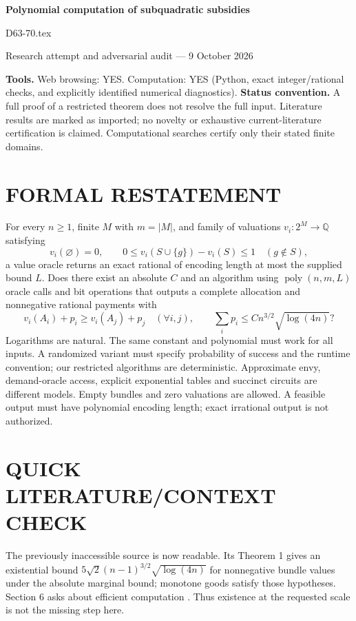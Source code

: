 \documentclass[11pt,a4paper]{article}
\theoremstyle{remark}\newtheorem{remark}[theorem]{Remark}
\begin{document}
\begin{center}
{\LARGE\bfseries Polynomial computation of subquadratic subsidies}\par\medskip
{\large D63-70.tex}\par
Research attempt and adversarial audit --- 9 October 2026
\end{center}
\label{problem:OP-0593}
\label{audited:ECON-006}
\label{audited:conventions}
\textbf{Tools.} Web browsing: YES. Computation: YES (Python, exact integer/rational checks, and explicitly identified numerical diagnostics).
\textbf{Status convention.} A full proof of a restricted theorem does not resolve the full input. Literature results are marked as imported; no novelty or exhaustive current-literature certification is claimed. Computational searches certify only their stated finite domains.

\section{FORMAL RESTATEMENT}
For every $n\ge1$, finite $M$ with $m=|M|$, and family of valuations $v_i:2^M\to\mathbb Q$ satisfying
\[
v_i(\varnothing)=0,\qquad 0\le v_i(S\cup\{g\})-v_i(S)\le1\quad(g\notin S),
\]
a value oracle returns an exact rational of encoding length at most the supplied bound $L$. Does there exist an absolute $C$ and an algorithm using $\operatorname{poly}(n,m,L)$ oracle calls and bit operations that outputs a complete allocation and nonnegative rational payments with
\[
v_i(A_i)+p_i\ge v_i(A_j)+p_j\quad(\forall i,j),\qquad
\sum_i p_i\le C n^{3/2}\sqrt{\log(4n)}?
\]
Logarithms are natural. The same constant and polynomial must work for all inputs. A randomized variant must specify probability of success and the runtime convention; our restricted algorithms are deterministic. Approximate envy, demand-oracle access, explicit exponential tables and succinct circuits are different models. Empty bundles and zero valuations are allowed. A feasible output must have polynomial encoding length; exact irrational output is not authorized.

\section{QUICK LITERATURE/CONTEXT CHECK}
The previously inaccessible source is now readable. Its Theorem 1 gives an existential bound $5\sqrt2(n-1)^{3/2}\sqrt{\log(4n)}$ for nonnegative bundle values under the absolute marginal bound; monotone goods satisfy those hypotheses. Section 6 asks about efficient computation \cite{subq}. Thus existence at the requested scale is not the missing step here.
\end{document}
